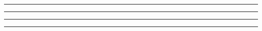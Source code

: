 \documentclass[10pt,a4paper]{article}
\begin{document}
{\begin{minipage}[c]{0.59\linewidth}
\vspace{0.3cm}

\rule{\linewidth}{0.4pt}

\vspace{0.4cm}

\rule{\linewidth}{0.4pt}

\vspace{0.4cm}

\rule{\linewidth}{0.4pt}

\vspace{0.4cm}

\rule{\linewidth}{0.4pt}

\end{minipage}

%
%
%
%
%
%
%
%
%
%
%
%
%
%
%
%
%
%
%
%
%
%
%
%
%
%
%
%
}
\end{document}
